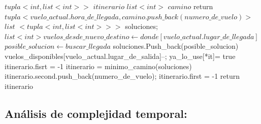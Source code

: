 \documentclass[a4paper]{article}
\begin{document}
\vspace{0.2cm}
\begin{algorithmic}[1]

        \State $tupla<int , list<int> >$ $itinerario$ 
        		\State $list<int>$ $camino$
        		\State return $tupla<vuelo\_actual.hora\_de\_llegada, camino.push\_back(numero\_de\_vuelo) >$
        	\Else 
       			\State $list$ $<tupla<int, list<int> > >$ soluciones;
       			\State $list<int> vuelos\_desde\_nuevo\_destino \gets donde[vuelo\_actual.lugar\_de\_llegada]$ 		 
						\State $posible\_solucion\gets buscar\_llegada$
						\State soluciones.Push\_back(posible\_solucion)
						\State vuelos\_disponibles[vuelo\_actual.lugar\_de\_salida]--;
						\State ya\_lo\_use[*it]= true
					\EndIf					
				\EndFor
					\State itinerario.fisrt = -1
				\Else
					\State itinerario =  minimo\_camino(soluciones)
					\State itinerario.second.push\_back(numero\_de\_vuelo);
				\EndIf
			\Else
				\State itinerario.first = -1
			\EndIf
			\State return itinerario
		 \EndIf			 	
\EndProcedure
\end{algorithmic}

\subsection{Análisis de complejidad temporal:}
\end{document}
